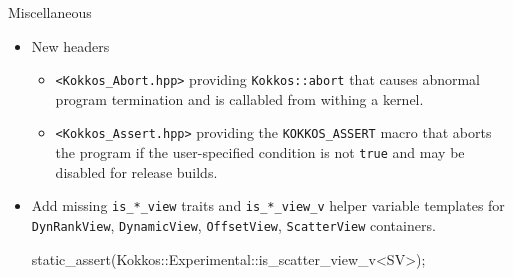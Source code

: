 \begin{frame}[fragile]{Miscellaneous}
\begin{itemize}
  \item New headers
    \begin{itemize}
    \item \texttt{<Kokkos\_Abort.hpp>} providing \texttt{Kokkos::abort} that
          causes abnormal program termination and is callabled from withing a
          kernel.
    \item \texttt{<Kokkos\_Assert.hpp>} providing the \texttt{KOKKOS\_ASSERT}
          macro that aborts the program if the user-specified condition is not
          \texttt{true} and may be disabled for release builds.
    \end{itemize}
  \item Add missing \texttt{is\_*\_view} traits and \texttt{is\_*\_view\_v}
        helper variable templates for \texttt{DynRankView},
        \texttt{DynamicView}, \texttt{OffsetView}, \texttt{ScatterView}
        containers.
\begin{code}
static_assert(Kokkos::Experimental::is_scatter_view_v<SV>);
\end{code}
\end{itemize}
\end{frame}

